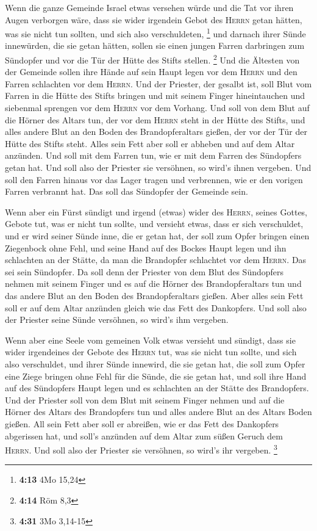  Wenn die ganze Gemeinde Israel etwas versehen würde und
die Tat vor ihren Augen verborgen wäre, dass sie wider irgendein Gebot
des \textsc{Herrn} getan hätten, was sie nicht tun sollten, und sich
also verschuldeten, \footnote{\textbf{4:13} 4Mo 15,24} 
und darnach ihrer Sünde innewürden, die sie getan hätten, sollen sie
einen jungen Farren darbringen zum Sündopfer und vor die Tür der Hütte
des Stifts stellen. \footnote{\textbf{4:14} Röm 8,3}  Und
die Ältesten von der Gemeinde sollen ihre Hände auf sein Haupt legen vor
dem \textsc{Herrn} und den Farren schlachten vor dem \textsc{Herrn}.
 Und der Priester, der gesalbt ist, soll Blut vom Farren
in die Hütte des Stifts bringen  und mit seinem Finger
hineintauchen und siebenmal sprengen vor dem \textsc{Herrn} vor dem
Vorhang.  Und soll von dem Blut auf die Hörner des Altars
tun, der vor dem \textsc{Herrn} steht in der Hütte des Stifts, und alles
andere Blut an den Boden des Brandopferaltars gießen, der vor der Tür
der Hütte des Stifts steht.  Alles sein Fett aber soll er
abheben und auf dem Altar anzünden.  Und soll mit dem
Farren tun, wie er mit dem Farren des Sündopfers getan hat. Und soll
also der Priester sie versöhnen, so wird's ihnen vergeben.
 Und soll den Farren hinaus vor das Lager tragen und
verbrennen, wie er den vorigen Farren verbrannt hat. Das soll das
Sündopfer der Gemeinde sein.

 Wenn aber ein Fürst sündigt und irgend (etwas) wider des
\textsc{Herrn}, seines Gottes, Gebote tut, was er nicht tun sollte, und
versieht etwas, dass er sich verschuldet,  und er wird
seiner Sünde inne, die er getan hat, der soll zum Opfer bringen einen
Ziegenbock ohne Fehl,  und seine Hand auf des Bockes
Haupt legen und ihn schlachten an der Stätte, da man die Brandopfer
schlachtet vor dem \textsc{Herrn}. Das sei sein Sündopfer.
 Da soll denn der Priester von dem Blut des Sündopfers
nehmen mit seinem Finger und es auf die Hörner des Brandopferaltars tun
und das andere Blut an den Boden des Brandopferaltars gießen.
 Aber alles sein Fett soll er auf dem Altar anzünden
gleich wie das Fett des Dankopfers. Und soll also der Priester seine
Sünde versöhnen, so wird's ihm vergeben.

 Wenn aber eine Seele vom gemeinen Volk etwas versieht
und sündigt, dass sie wider irgendeines der Gebote des \textsc{Herrn}
tut, was sie nicht tun sollte, und sich also verschuldet,
 und ihrer Sünde innewird, die sie getan hat, die soll
zum Opfer eine Ziege bringen ohne Fehl für die Sünde, die sie getan hat,
 und soll ihre Hand auf des Sündopfers Haupt legen und es
schlachten an der Stätte des Brandopfers.  Und der
Priester soll von dem Blut mit seinem Finger nehmen und auf die Hörner
des Altars des Brandopfers tun und alles andere Blut an des Altars Boden
gießen.  All sein Fett aber soll er abreißen, wie er das
Fett des Dankopfers abgerissen hat, und soll's anzünden auf dem Altar
zum süßen Geruch dem \textsc{Herrn}. Und soll also der Priester sie
versöhnen, so wird's ihr vergeben. \footnote{\textbf{4:31} 3Mo 3,14-15}

